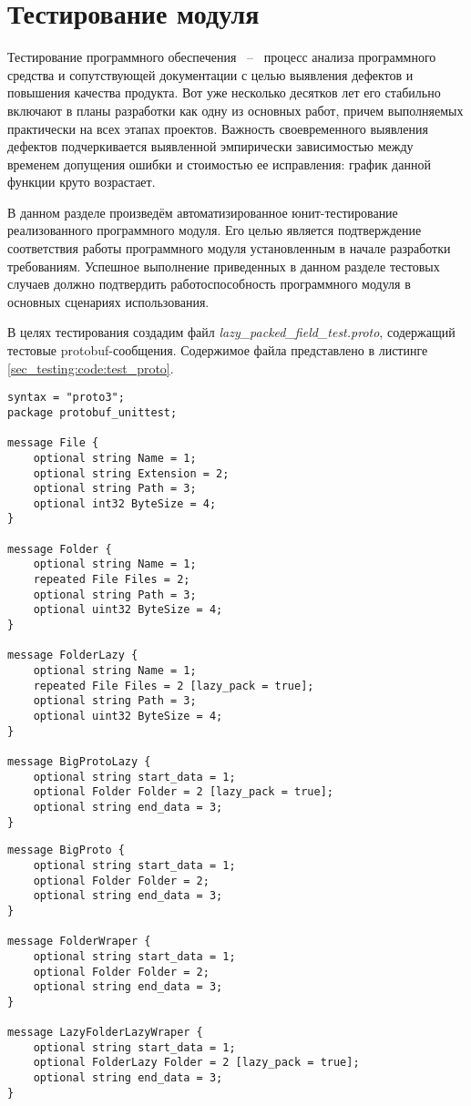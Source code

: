 \section{Тестирование модуля}

Тестирование программного обеспечения ~--~ процесс анализа программного средства и сопутствующей документации с целью выявления
дефектов и повышения качества продукта. Вот уже несколько десятков лет его стабильно включают в планы разработки как одну из основных работ,
причем выполняемых практически на всех этапах проектов. Важность своевременного выявления дефектов подчеркивается выявленной
эмпирически зависимостью между временем допущения ошибки и стоимостью ее исправления: график данной функции круто возрастает.

В данном разделе произведём автоматизированное юнит-тестирование реализованного программного модуля. 
Его целью является подтверждение соответствия работы программного модуля установленным в начале
разработки требованиям. Успешное выполнение приведенных в данном разделе тестовых случаев должно подтвердить работоспособность
программного модуля в основных сценариях использования.

В целях тестирования создадим файл \textit{lazy\_packed\_field\_test.proto}, содержащий тестовые protobuf-сообщения.
Содержимое файла представлено в листинге \ref{sec_testing:code:test_proto}.

\begin{lstlisting}[style=CodeListing, label=sec_testing:code:test_proto, caption={Protobuf-сообщения для тестирования}]
syntax = "proto3";
package protobuf_unittest;

message File {
    optional string Name = 1;
    optional string Extension = 2;
    optional string Path = 3;
    optional int32 ByteSize = 4;
}

message Folder {
    optional string Name = 1;
    repeated File Files = 2;
    optional string Path = 3;
    optional uint32 ByteSize = 4;
}

message FolderLazy {
    optional string Name = 1;
    repeated File Files = 2 [lazy_pack = true];
    optional string Path = 3;
    optional uint32 ByteSize = 4;
}

message BigProtoLazy {
    optional string start_data = 1;
    optional Folder Folder = 2 [lazy_pack = true];
    optional string end_data = 3;
}
\end{lstlisting}
\pagebreak
\begin{lstlisting}[style=CodeListing]
message BigProto {
    optional string start_data = 1;
    optional Folder Folder = 2;
    optional string end_data = 3;
}

message FolderWraper {
    optional string start_data = 1;
    optional Folder Folder = 2;
    optional string end_data = 3;
}

message LazyFolderLazyWraper {
    optional string start_data = 1;
    optional FolderLazy Folder = 2 [lazy_pack = true];
    optional string end_data = 3;
}
\end{lstlisting}

